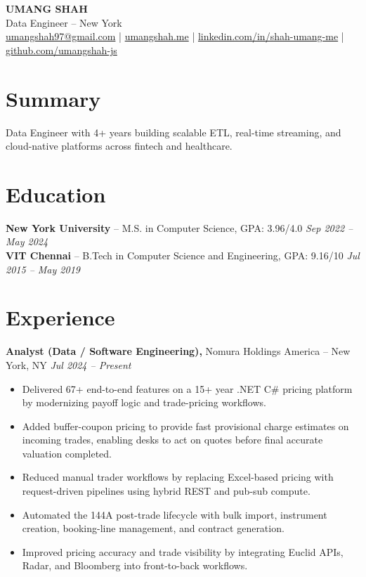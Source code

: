 \documentclass[10pt]{article}
\newcommand{\BodyTextSize}{\fontsize{10.5pt}{11.25pt}\selectfont}
\begin{document}
\begin{center}
{\LARGE \textbf{UMANG SHAH}}\\[-1pt]
Data Engineer -- New York\\[-1pt]
\BodyTextSize \href{mailto:umangshah97@gmail.com}{umangshah97@gmail.com} \;|\; \href{https://umangshah.me}{umangshah.me} \;|\; \href{https://www.linkedin.com/in/shah-umang-me}{linkedin.com/in/shah-umang-me} \;|\; \href{https://github.com/umangshah-js}{github.com/umangshah-js}
\end{center}

\vspace{-2pt}
\BodyTextSize

\section*{Summary}
Data Engineer with 4+ years building scalable ETL, real-time streaming, and cloud-native platforms across fintech and healthcare.

\vspace{0pt}

\section*{Education}
\textbf{New York University} -- M.S. in Computer Science, GPA: 3.96/4.0 \hfill \textit{Sep 2022 -- May 2024} \\
\textbf{VIT Chennai} -- B.Tech in Computer Science and Engineering, GPA: 9.16/10 \hfill \textit{Jul 2015 -- May 2019}

\vspace{0pt}

\section*{Experience}
\textbf{Analyst (Data / Software Engineering),} Nomura Holdings America -- New York, NY \hfill \textit{Jul 2024 -- Present} \\
\vspace{0pt}
\begin{itemize}
  \item Delivered 67+ end-to-end features on a 15+ year .NET C\# pricing platform by modernizing payoff logic and trade-pricing workflows.
  \item Added buffer-coupon pricing to provide fast provisional charge estimates on incoming trades, enabling desks to act on quotes before final accurate valuation completed.
  \item Reduced manual trader workflows by replacing Excel-based pricing with request-driven pipelines using hybrid REST and pub-sub compute.
  \item Automated the 144A post-trade lifecycle with bulk import, instrument creation, booking-line management, and contract generation.
  \item Improved pricing accuracy and trade visibility by integrating Euclid APIs, Radar, and Bloomberg into front-to-back workflows.
\end{itemize}
\end{document}
